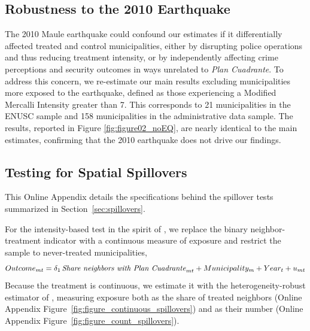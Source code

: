 \subsection{Robustness to the 2010 Earthquake}
\label{sec:earthquake}

The 2010 Maule earthquake could confound our estimates if it differentially affected treated and control municipalities, either by disrupting police operations and thus reducing treatment intensity, or by independently affecting crime perceptions and security outcomes in ways unrelated to \emph{Plan Cuadrante}. To address this concern, we re-estimate our main results excluding municipalities more exposed to the earthquake, defined as those experiencing a Modified Mercalli Intensity greater than 7. This corresponds to 21 municipalities in the ENUSC sample and 158 municipalities in the administrative data sample. The results, reported in Figure \ref{fig:figure02_noEQ}, are nearly identical to the main estimates, confirming that the 2010 earthquake does not drive our findings.


\clearpage

\subsection{Testing for Spatial Spillovers}
\label{spillovers}

This Online Appendix details the specifications behind the spillover tests summarized in Section~\ref{sec:spillovers}.

For the intensity-based test in the spirit of \citet{crepon2013}, we replace the binary neighbor-treatment indicator with a continuous measure of exposure and restrict the sample to never-treated municipalities,
\begin{equation}
Outcome_{mt}= \delta_{1}\,\mbox{\textit{Share neighbors with Plan Cuadrante}}_{mt} + Municipality_{m} + Year_{t} + u_{mt}
\label{eq:crepon}
\end{equation}
\noindent Because the treatment is continuous, we estimate it with the heterogeneity-robust estimator of \citet{Chaisemartin}, measuring exposure both as the share of treated neighbors (Online Appendix Figure~\ref{fig:figure_continuous_spillovers}) and as their number (Online Appendix Figure~\ref{fig:figure_count_spillovers}).

